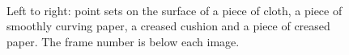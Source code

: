 \begin{figure}[!t]
        \hspace{5mm}%
        \addtocounter{subfigure}{-1}
        \begin{minipage}[b]{0.2\textwidth}
        \end{minipage}\\%
        \addtocounter{subfigure}{-1}
        \caption{Left to right: point sets on the surface of a piece of cloth, a piece of smoothly curving paper, a creased cushion and a piece of creased paper. The frame number is below each image. }
\label{fig:mini:subfig_deformableimages} %
\end{figure}%
